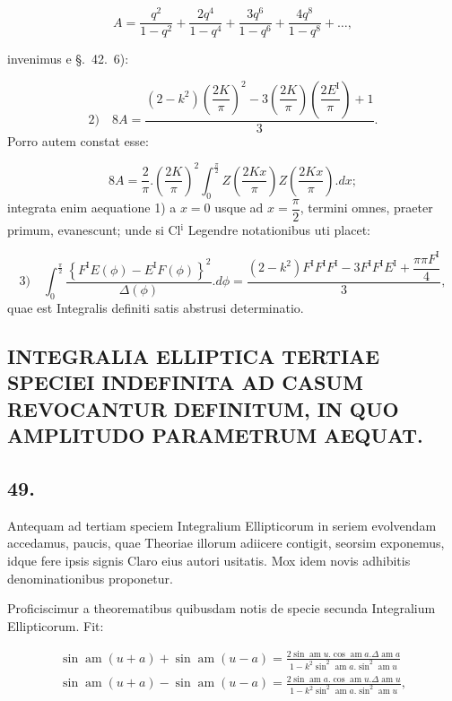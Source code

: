 \documentclass{article}
\begin{document}
\[
A=\frac{q^{2}}{1-q^{2}}+\frac{2q^{4}}{1-q^{4}}+\frac{3q^{6}}{1-q^{6}}+\frac{4q^{8}}{1-q^{8}}+\ldots,
\]

invenimus e §.\ 42.\ 6):

\[
\text{2)}\quad8A=\frac{(2-k^{2})\left(\dfrac{2K}{\pi}\right)^{2}-3\left(\dfrac{2K}{\pi}\right)\left(\dfrac{2E^{\mathrm{I}}}{\pi}\right)+1}{3}.
\]
Porro autem constat esse:

\[
8A=\frac{2}{\pi}.\left(\frac{2K}{\pi}\right)^{2}\int_{0}^{\frac{\pi}{2}}Z\left(\frac{2Kx}{\pi}\right)Z\left(\frac{2Kx}{\pi}\right).dx;
\]
integrata enim aequatione 1) a $x=0$ usque ad $x=\dfrac{\pi}{2}$, termini omnes, praeter primum, evanescunt; unde si Cl$^{\mathrm{i}}$ Legendre notationibus uti placet:

\[
\text{3)}\quad\int_{0}^{\frac{\pi}{2}}\frac{\left\{F^{\mathrm{I}}E(\phi)-E^{\mathrm{I}}F(\phi)\right\}^{2}}{\Delta(\phi)}.d\phi=\frac{(2-k^{2})F^{\mathrm{I}}F^{\mathrm{I}}F^{\mathrm{I}}-3F^{\mathrm{I}}F^{\mathrm{I}}E^{\mathrm{I}}+\dfrac{\pi\pi F^{\mathrm{I}}}{4}}{3},
\]
quae est Integralis definiti satis abstrusi determinatio.

\subsection*{INTEGRALIA ELLIPTICA TERTIAE SPECIEI INDEFINITA AD CASUM REVOCANTUR DEFINITUM, IN QUO AMPLITUDO PARAMETRUM AEQUAT.}

\subsection*{49.}

Antequam ad tertiam speciem Integralium Ellipticorum in seriem evolvendam accedamus, paucis, quae Theoriae illorum adiicere contigit, seorsim exponemus, idque fere ipsis signis Claro eius autori usitatis. Mox idem novis adhibitis denominationibus proponetur.

Proficiscimur a theorematibus quibusdam notis de specie secunda Integralium Ellipticorum. Fit:

\[
\begin{gathered}
\sin\operatorname{am}(u+a)+\sin\operatorname{am}(u-a)=\frac{2\sin\operatorname{am}u.\cos\operatorname{am}a.\Delta\operatorname{am}a}{1-k^{2}\sin^{2}\operatorname{am}a.\sin^{2}\operatorname{am}u}\\[1.5ex]
\sin\operatorname{am}(u+a)-\sin\operatorname{am}(u-a)=\frac{2\sin\operatorname{am}a.\cos\operatorname{am}u.\Delta\operatorname{am}u}{1-k^{2}\sin^{2}\operatorname{am}a.\sin^{2}\operatorname{am}u},
\end{gathered}
\]
\end{document}
